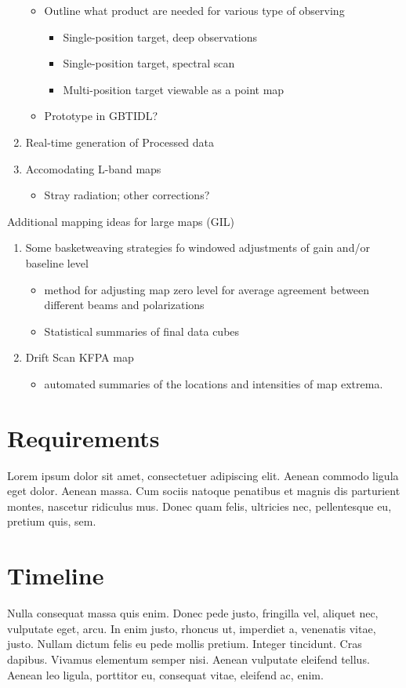 \documentclass[paper=a4, fontsize=11pt]{scrartcl}	%
\numberwithin{equation}{section}															%
\numberwithin{figure}{section}																%
\numberwithin{table}{section}																%
\begin{document}
\begin{enumerate}
  \begin{itemize}
    \item Outline what product are needed for various type of observing
    \begin{itemize}
      \item Single-position target, deep observations
      \item Single-position target, spectral scan
      \item Multi-position target viewable as a point map
    \end{itemize}
    \item Prototype in GBTIDL?
  \end{itemize}
\item Real-time generation of Processed data
\item Accomodating L-band maps
  \begin{itemize}
    \item Stray radiation; other corrections?
  \end{itemize}
\end {enumerate}

Additional mapping ideas for large maps (GIL)

\begin{enumerate}
\item Some basketweaving strategies fo windowed adjustments of gain and/or baseline level
  \begin{itemize}
    \item method for adjusting map zero level for average agreement between different beams and polarizations
    \item Statistical summaries of final data cubes
  \end{itemize}
\item Drift Scan KFPA map
  \begin {itemize}
    \item automated summaries of the locations and intensities of map extrema.
  \end {itemize}
\end{enumerate}

\section{Requirements}
Lorem ipsum dolor sit amet, consectetuer adipiscing elit. Aenean commodo ligula eget dolor. Aenean massa. Cum sociis natoque penatibus et magnis dis parturient montes, nascetur ridiculus mus. Donec quam felis, ultricies nec, pellentesque eu, pretium quis, sem. 

\section{Timeline}
Nulla consequat massa quis enim. Donec pede justo, fringilla vel, aliquet nec, vulputate eget, arcu. In enim justo, rhoncus ut, imperdiet a, venenatis vitae, justo. Nullam dictum felis eu pede mollis pretium. Integer tincidunt. Cras dapibus. Vivamus elementum semper nisi. Aenean vulputate eleifend tellus. Aenean leo ligula, porttitor eu, consequat vitae, eleifend ac, enim.
\end{document}
